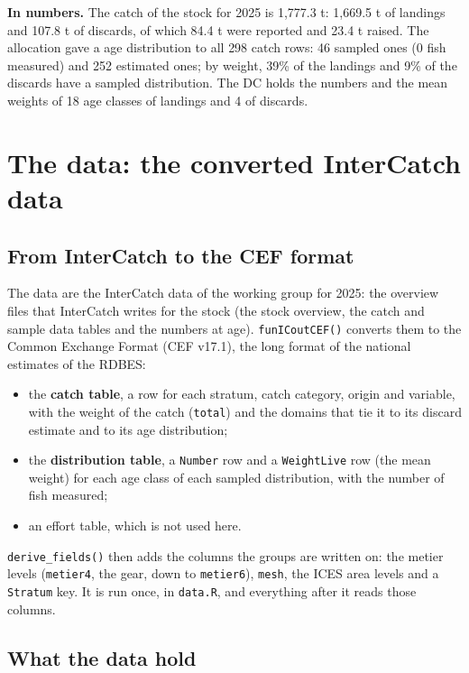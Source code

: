 \documentclass[
  a4paper,
  DIV=11,
  numbers=noendperiod]{scrartcl}
\providecommand{\tightlist}{%
  \setlength{\itemsep}{0pt}\setlength{\parskip}{0pt}}
\begin{document}
\textbf{In numbers.} The catch of the stock for 2025 is 1,777.3 t:
1,669.5 t of landings and 107.8 t of discards, of which 84.4 t were
reported and 23.4 t raised. The allocation gave a age distribution to
all 298 catch rows: 46 sampled ones (0 fish measured) and 252 estimated
ones; by weight, 39\% of the landings and 9\% of the discards have a
sampled distribution. The DC holds the numbers and the mean weights of
18 age classes of landings and 4 of discards.

\section{The data: the converted InterCatch
data}\label{the-data-the-converted-intercatch-data}

\subsection{From InterCatch to the CEF
format}\label{from-intercatch-to-the-cef-format}

The data are the InterCatch data of the working group for 2025: the
overview files that InterCatch writes for the stock (the stock overview,
the catch and sample data tables and the numbers at age).
\texttt{funICoutCEF()} converts them to the Common Exchange Format (CEF
v17.1), the long format of the national estimates of the RDBES:

\begin{itemize}
\tightlist
\item
  the \textbf{catch table}, a row for each stratum, catch category,
  origin and variable, with the weight of the catch (\texttt{total}) and
  the domains that tie it to its discard estimate and to its age
  distribution;
\item
  the \textbf{distribution table}, a \texttt{Number} row and a
  \texttt{WeightLive} row (the mean weight) for each age class of each
  sampled distribution, with the number of fish measured;
\item
  an effort table, which is not used here.
\end{itemize}

\texttt{derive\_fields()} then adds the columns the groups are written
on: the metier levels (\texttt{metier4}, the gear, down to
\texttt{metier6}), \texttt{mesh}, the ICES area levels and a
\texttt{Stratum} key. It is run once, in \texttt{data.R}, and everything
after it reads those columns.

\subsection{What the data hold}\label{what-the-data-hold}
\end{document}
